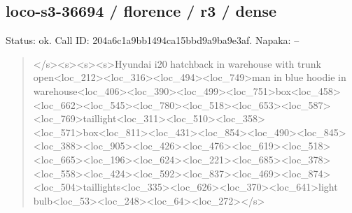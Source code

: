 \documentclass[10pt,a4paper]{article}
\begin{document}
\subsection*{loco-s3-36694 / florence / r3 / dense}
Status: ok. Call ID: 204a6c1a9bb1494ca15bbd9a9ba9e3af. Napaka: --
\begin{quote}\footnotesize
</s>\allowbreak{}<s>\allowbreak{}<s>\allowbreak{}<s>\allowbreak{}Hyundai i20 hatchback in warehouse with trunk open<loc\_212>\allowbreak{}<loc\_316>\allowbreak{}<loc\_494>\allowbreak{}<\allowbreak{}loc\_749>\allowbreak{}man in blue hoodie in warehouse<loc\_406>\allowbreak{}<loc\_390>\allowbreak{}<loc\_\allowbreak{}499>\allowbreak{}<loc\_751>\allowbreak{}box<loc\_458>\allowbreak{}<loc\_66\allowbreak{}2>\allowbreak{}<loc\_545>\allowbreak{}<loc\_780>\allowbreak{}<loc\_518>\allowbreak{}<lo\allowbreak{}c\_653>\allowbreak{}<loc\_587>\allowbreak{}<loc\_769>\allowbreak{}tailligh\allowbreak{}t<loc\_311>\allowbreak{}<loc\_510>\allowbreak{}<loc\_358>\allowbreak{}<loc\allowbreak{}\_571>\allowbreak{}box<loc\_811>\allowbreak{}<loc\_431>\allowbreak{}<loc\_8\allowbreak{}54>\allowbreak{}<loc\_490>\allowbreak{}<loc\_845>\allowbreak{}<loc\_388>\allowbreak{}<l\allowbreak{}oc\_905>\allowbreak{}<loc\_426>\allowbreak{}<loc\_476>\allowbreak{}<loc\_61\allowbreak{}9>\allowbreak{}<loc\_518>\allowbreak{}<loc\_665>\allowbreak{}<loc\_196>\allowbreak{}<lo\allowbreak{}c\_624>\allowbreak{}<loc\_221>\allowbreak{}<loc\_685>\allowbreak{}<loc\_378\allowbreak{}>\allowbreak{}<loc\_558>\allowbreak{}<loc\_424>\allowbreak{}<loc\_592>\allowbreak{}<loc\allowbreak{}\_837>\allowbreak{}<loc\_469>\allowbreak{}<loc\_874>\allowbreak{}<loc\_504>\allowbreak{}\allowbreak{}taillights<loc\_335>\allowbreak{}<loc\_626>\allowbreak{}<loc\allowbreak{}\_370>\allowbreak{}<loc\_641>\allowbreak{}light bulb<loc\_53>\allowbreak{}<loc\_248>\allowbreak{}<loc\_64>\allowbreak{}<lo\allowbreak{}c\_272>\allowbreak{}</s>\allowbreak{}
\end{quote}
\end{document}
